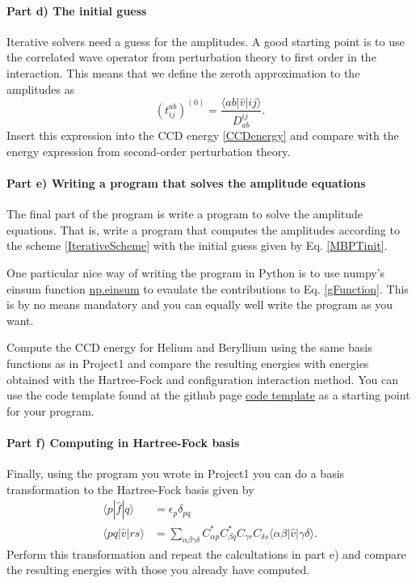 \documentclass[a4paper,10pt]{article}
\newcommand{\braket}[1]{\langle#1\rangle}
\theoremstyle{definition}
\begin{document}
\paragraph{Part d) The initial guess}
Iterative solvers need a guess for the amplitudes. A good starting point is to use
the correlated wave operator from perturbation theory to first order in the interaction.
This means that we define the zeroth approximation to the amplitudes as
\begin{equation}
 (t^{ab}_{ij})^{(0)} = \frac{\braket{ab|\hat{v}|ij}}{D^{ij}_{ab}} \label{MBPTinit}. 
\end{equation}
Insert this expression into the CCD energy \ref{CCDenergy} and compare with the energy expression from second-order 
perturbation theory.

\paragraph{Part e) Writing a program that solves the amplitude equations}
The final part of the program is write a program to solve the amplitude equations. That is, write 
a program that computes the amplitudes according to the scheme \ref{IterativeScheme} with the initial 
guess given by Eq. \ref{MBPTinit}. 

One particular nice way of writing the program in Python is to use numpy's einsum 
function \href{https://docs.scipy.org/doc/numpy-1.15.1/reference/generated/numpy.einsum.html}{np.einsum} to evaulate 
the contributions to Eq. \ref{gFunction}. This is by no means mandatory and you can equally well write the program 
as you want.

Compute the CCD energy for Helium and Beryllium using the same basis functions as in Project1 and compare the resulting 
energies with energies obtained with the Hartree-Fock and configuration interaction method. You can use the code template 
found at the github page \href{https://github.com/ManyBodyPhysics/FYS4480/tree/master/doc/Projects/2018/Project1/code_template}{code template} as a starting point for 
your program. 

\paragraph{Part f) Computing in Hartree-Fock basis}
Finally, using the program you wrote in Project1 you can do a basis transformation to the Hartree-Fock basis given 
by 
\begin{align*}
 \braket{p|\hat{f}|q}   &= \epsilon_p \delta_{pq} \\
 \braket{pq|\hat{v}|rs} &= \sum_{\alpha \beta \gamma \delta} C^*_{\alpha p} C^*_{\beta q} C_{\gamma r} C_{\delta s} \braket{\alpha \beta | \hat{v} | \gamma \delta }.
\end{align*}
Perform this transformation and repeat the calcultations in part e) and compare the resulting energies with those you already 
have computed.
\end{document}
